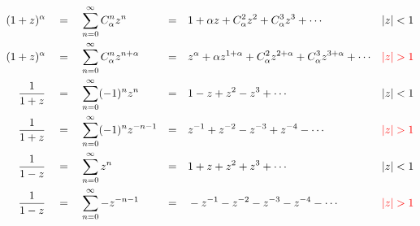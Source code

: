 \documentclass[main.tex]{subfiles}
\begin{document}
\begin{align*}
    (1+z)^{\alpha} \quad&=\quad \sum_{n=0}^{\infty} C_\alpha^nz^n &=&\quad 1+\alpha z+C_\alpha^2z^2+C_\alpha^3z^3+\cdots & |z|<1 \\
    (1+z)^{\alpha} \quad&=\quad \sum_{n=0}^{\infty} C_\alpha^nz^{n+\alpha} &=&\quad z^{\alpha}+\alpha z^{1+\alpha}+C_\alpha^2z^{2+\alpha}+C_\alpha^3z^{3+\alpha}+\cdots & {\color{red}|z|>1} \\
    \frac{1}{1+z} \quad&=\quad \sum_{n=0}^{\infty}(-1)^nz^n &=&\quad 1-z+z^2-z^3+\cdots & |z|<1 \\
    \frac{1}{1+z} \quad&=\quad \sum_{n=0}^{\infty}(-1)^nz^{-n-1} &=&\quad z^{-1}+z^{-2}-z^{-3}+z^{-4}-\cdots & {\color{red}|z|>1} \\
    \frac{1}{1-z} \quad&=\quad \sum_{n=0}^{\infty}z^n &=&\quad 1+z+z^2+z^3+\cdots & |z|<1 \\
    \frac{1}{1-z} \quad&=\quad \sum_{n=0}^{\infty}-z^{-n-1} &=&\quad -z^{-1}-z^{-2}-z^{-3}-z^{-4}-\cdots & {\color{red}|z|>1} %
\end{align*}
\end{document}
